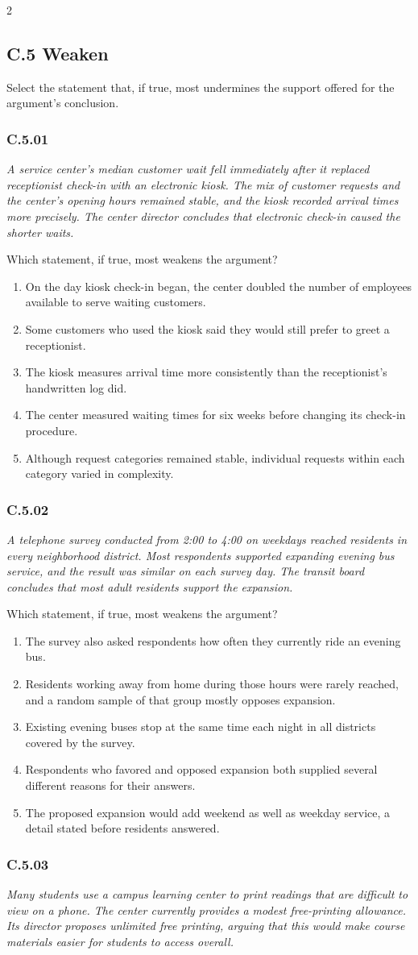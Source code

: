 \documentclass[10pt]{extarticle}
\newcommand{\choice}[1]{\item #1}
\newcommand{\bankitem}[1]{\subsubsection*{#1}}
\begin{document}
\begin{multicols}{2}
\subsection*{C.5 Weaken}
Select the statement that, if true, most undermines the support offered for the argument's conclusion.
\bankitem{C.5.01}
\emph{A service center's median customer wait fell immediately after it replaced receptionist check-in with an electronic kiosk. The mix of customer requests and the center's opening hours remained stable, and the kiosk recorded arrival times more precisely. The center director concludes that electronic check-in caused the shorter waits.}

Which statement, if true, most weakens the argument?
\begin{enumerate}[label=(\alph*)]
  \choice{On the day kiosk check-in began, the center doubled the number of employees available to serve waiting customers.}
  \choice{Some customers who used the kiosk said they would still prefer to greet a receptionist.}
  \choice{The kiosk measures arrival time more consistently than the receptionist's handwritten log did.}
  \choice{The center measured waiting times for six weeks before changing its check-in procedure.}
  \choice{Although request categories remained stable, individual requests within each category varied in complexity.}
\end{enumerate}
\bankitem{C.5.02}
\emph{A telephone survey conducted from 2:00 to 4:00 on weekdays reached residents in every neighborhood district. Most respondents supported expanding evening bus service, and the result was similar on each survey day. The transit board concludes that most adult residents support the expansion.}

Which statement, if true, most weakens the argument?
\begin{enumerate}[label=(\alph*)]
  \choice{The survey also asked respondents how often they currently ride an evening bus.}
  \choice{Residents working away from home during those hours were rarely reached, and a random sample of that group mostly opposes expansion.}
  \choice{Existing evening buses stop at the same time each night in all districts covered by the survey.}
  \choice{Respondents who favored and opposed expansion both supplied several different reasons for their answers.}
  \choice{The proposed expansion would add weekend as well as weekday service, a detail stated before residents answered.}
\end{enumerate}
\bankitem{C.5.03}
\emph{Many students use a campus learning center to print readings that are difficult to view on a phone. The center currently provides a modest free-printing allowance. Its director proposes unlimited free printing, arguing that this would make course materials easier for students to access overall.}


\end{multicols}
\end{document}

